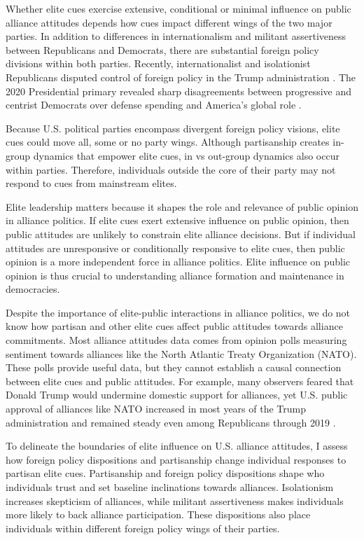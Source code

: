 \documentclass[12pt]{article}
\begin{document}
Whether elite cues exercise extensive, conditional or minimal influence on public alliance attitudes depends how cues impact different wings of the two major parties. 
In addition to differences in internationalism and militant assertiveness between Republicans and Democrats, there are substantial foreign policy divisions within both parties.
Recently, internationalist and isolationist Republicans disputed control of foreign policy in the Trump administration \citep{Dueck2019}. 
The 2020 Presidential primary revealed sharp disagreements between progressive and centrist Democrats over defense spending and America's global role \citep{Robinson2019demfp}.


Because U.S. political parties encompass divergent foreign policy visions, elite cues could move all, some or no party wings.
Although partisanship creates in-group dynamics that empower elite cues, in vs out-group dynamics also occur within parties. 
Therefore, individuals outside the core of their party may not respond to cues from mainstream elites.


Elite leadership matters because it shapes the role and relevance of public opinion in alliance politics.
If elite cues exert extensive influence on public opinion, then public attitudes are unlikely to constrain elite alliance decisions.
But if individual attitudes are unresponsive or conditionally responsive to elite cues, then public opinion is a more independent force in alliance politics. 
Elite influence on public opinion is thus crucial to understanding alliance formation and maintenance in democracies.  


Despite the importance of elite-public interactions in alliance politics, we do not know how partisan and other elite cues affect public attitudes towards alliance commitments. 
Most alliance attitudes data comes from opinion polls measuring sentiment towards alliances like the North Atlantic Treaty Organization (NATO).
These polls provide useful data, but they cannot establish a causal connection between elite cues and public attitudes.
For example, many observers feared that Donald Trump would undermine domestic support for alliances, yet U.S. public approval of alliances like NATO increased in most years of the Trump administration and remained steady even among Republicans through 2019 \citep{PewNATO2020}.


To delineate the boundaries of elite influence on U.S. alliance attitudes, I assess how foreign policy dispositions and partisanship change individual responses to partisan elite cues.
Partisanship and foreign policy dispositions shape who individuals trust and set baseline inclinations towards alliances. 
Isolationism increases skepticism of alliances, while militant assertiveness makes individuals more likely to back alliance participation. 
These dispositions also place individuals within different foreign policy wings of their parties. 
\end{document}
